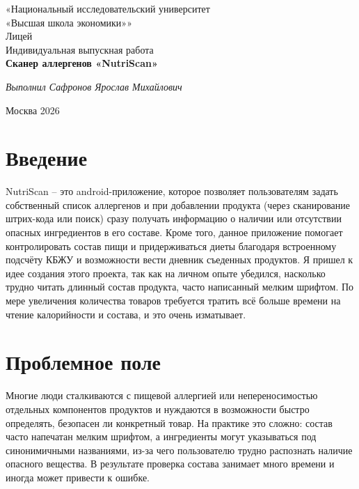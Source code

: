 \documentclass[14pt,a4paper]{extarticle}
\begin{document}
\begin{titlepage}
	\thispagestyle{empty}
	\centering
	«Национальный исследовательский университет\\
	«Высшая школа экономики»»\\[0.5cm]
	Лицей\\[5cm]
	
	Индивидуальная выпускная работа\\
	\textbf{Сканер аллергенов «NutriScan»}\\[4cm]
	
	\begin{flushright}
		\textit{Выполнил Сафронов Ярослав Михайлович\\}
	\end{flushright}
	
	\vfill
	Москва 2026
	
\end{titlepage}

\setcounter{page}{2}


\section{Введение}

NutriScan – это android-приложение, которое позволяет пользователям задать собственный список аллергенов и при добавлении продукта (через сканирование штрих-кода или поиск) сразу получать информацию о наличии или отсутствии опасных ингредиентов в его составе. Кроме того, данное приложение помогает контролировать состав пищи и придерживаться диеты благодаря встроенному подсчёту КБЖУ и возможности вести дневник съеденных продуктов. Я пришел к идее создания этого проекта, так как на личном опыте убедился, насколько трудно читать длинный состав продукта, часто написанный мелким шрифтом. По мере увеличения количества товаров требуется тратить всё больше времени на чтение калорийности и состава, и это очень изматывает.



\section{Проблемное поле}

Многие люди сталкиваются с пищевой аллергией или непереносимостью отдельных компонентов продуктов и нуждаются в возможности быстро определять, безопасен ли конкретный товар. На практике это сложно: состав часто напечатан мелким шрифтом, а ингредиенты могут указываться под синонимичными названиями, из-за чего пользователю трудно распознать наличие опасного вещества. В результате проверка состава занимает много времени и иногда может привести к ошибке. 
\end{document}
